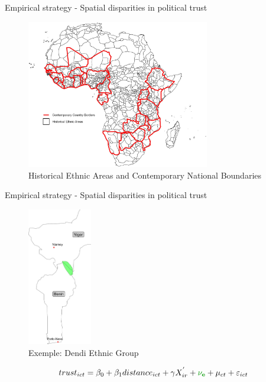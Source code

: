 \documentclass[10pt]{beamer}
\begin{document}
\begin{frame}{Empirical strategy - Spatial disparities in political trust}
    \begin{figure}
        \centering
        \caption{Historical Ethnic Areas and Contemporary National Boundaries}
        \includegraphics[width=8cm]{murdock_map.jpg}
    \end{figure}
    
\end{frame}


\begin{frame}{Empirical strategy - Spatial disparities in political trust}

    \begin{figure}
        \centering
        \caption{Exemple: Dendi Ethnic Group}
        \includegraphics[width=2.8cm]{bdd_map.jpg}
    \end{figure}

\begin{equation}
trust_{ict}=\beta_{0}+\beta_{1}distance_{ict}+\gamma X^{'}_{ir}+\textcolor[rgb]{0.0,0.6,0.0}{\mathbf{\nu_{e}}}+\mu_{ct}+\varepsilon_{ict}
\end{equation}

\end{frame}
\end{document}
